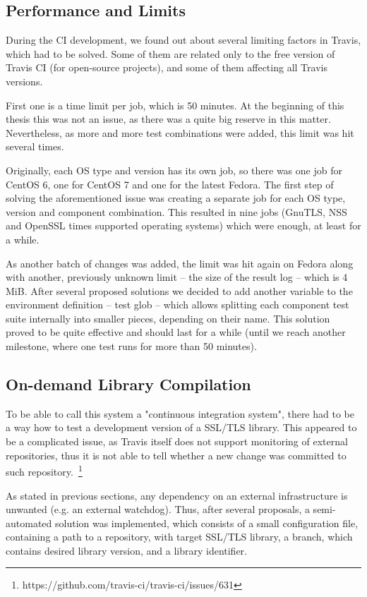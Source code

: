 \subsection{Performance and Limits} \label{ref:performance-limits}
    During the CI development, we found out about several limiting factors
    in Travis, which had to be solved. Some of them are related only to
    the free version of Travis CI (for open-source projects), and some
    of them affecting all Travis versions.

    First one is a time limit per job, which is 50 minutes. At the beginning
    of this thesis this was not an issue, as there was a quite big reserve in
    this matter. Nevertheless, as more and more test combinations were added,
    this limit was hit several times.

    Originally, each OS type and version has its own job, so there was one job
    for CentOS 6, one for CentOS 7 and one for the latest Fedora. The first
    step of solving the aforementioned issue
    was creating a separate job for each OS type, version and component
    combination. This resulted in nine jobs (GnuTLS, NSS and OpenSSL times
    supported operating systems) which were enough, at least for a while.

    As another batch of changes was added, the limit was hit again on Fedora
    along with another, previously unknown limit -- the size of the result log
    -- which is 4 MiB.
    After several proposed solutions we decided to add another variable
    to the environment definition -- test glob -- which allows splitting
    each component test suite internally into smaller pieces, depending on their
    name. This solution proved to be quite effective and should last for
    a while (until we reach another milestone, where one test runs for more than
    50 minutes).

\subsection{On-demand Library Compilation}
    To be able to call this system a "continuous integration system", there had
    to be a way how to test a development version of a SSL/TLS library. This
    appeared to be a complicated issue, as Travis itself does not support
    monitoring of external repositories, thus it is not able to tell whether
    a new change was committed to such
    repository.~\footnote{https://github.com/travis-ci/travis-ci/issues/631}

    As stated in previous sections, any dependency on an external infrastructure
    is unwanted (e.g. an external watchdog). Thus, after several proposals,
    a semi-automated solution was implemented, which consists of a small configuration
    file, containing a path to a repository, with target SSL/TLS library,
    a branch, which contains desired library version, and a library identifier.

